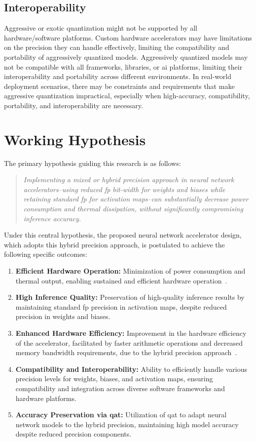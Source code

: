 \subsection{Interoperability}
Aggressive or exotic quantization might not be supported by all hardware/software platforms. Custom hardware accelerators may have limitations on the precision they can handle effectively, limiting the compatibility and portability of aggressively quantized models. Aggressively quantized models may not be compatible with all frameworks, libraries, or \gls{ai} platforms, limiting their interoperability and portability across different environments. In real-world deployment scenarios, there may be constraints and requirements that make aggressive quantization impractical, especially when high-accuracy, compatibility, portability, and interoperability are necessary.
\section{Working Hypothesis}

The primary hypothesis guiding this research is as follows:

\begin{quote}
	\textit{Implementing a mixed or hybrid precision approach in neural network accelerators--using reduced \gls{fp} bit-width for weights and biases while retaining standard \gls{fp} for activation maps--can substantially decrease power consumption and thermal dissipation, without significantly compromising inference accuracy.}
\end{quote}

Under this central hypothesis, the proposed neural network accelerator design, which adopts this hybrid precision approach, is postulated to achieve the following specific outcomes:

\begin{enumerate}[label={\textbf{H\arabic*}}]
	\item \textbf{Efficient Hardware Operation:} Minimization of power consumption and thermal output, enabling sustained and efficient hardware operation~\cite{lai2017deep}.
	\item \textbf{High Inference Quality:} Preservation of high-quality inference results by maintaining standard \gls{fp} precision in activation maps, despite reduced precision in weights and biases.
	\item \textbf{Enhanced Hardware Efficiency:} Improvement in the hardware efficiency of the accelerator, facilitated by faster arithmetic operations and decreased memory bandwidth requirements, due to the hybrid precision approach~\cite{lai2017deep}.
	\item \textbf{Compatibility and Interoperability:} Ability to efficiently handle various precision levels for weights, biases, and activation maps, ensuring compatibility and integration across diverse software frameworks and hardware platforms.
	\item \textbf{Accuracy Preservation via \gls{qat}:} Utilization of \gls{qat} to adapt neural network models to the hybrid precision, maintaining high model accuracy despite reduced precision components.
\end{enumerate}

